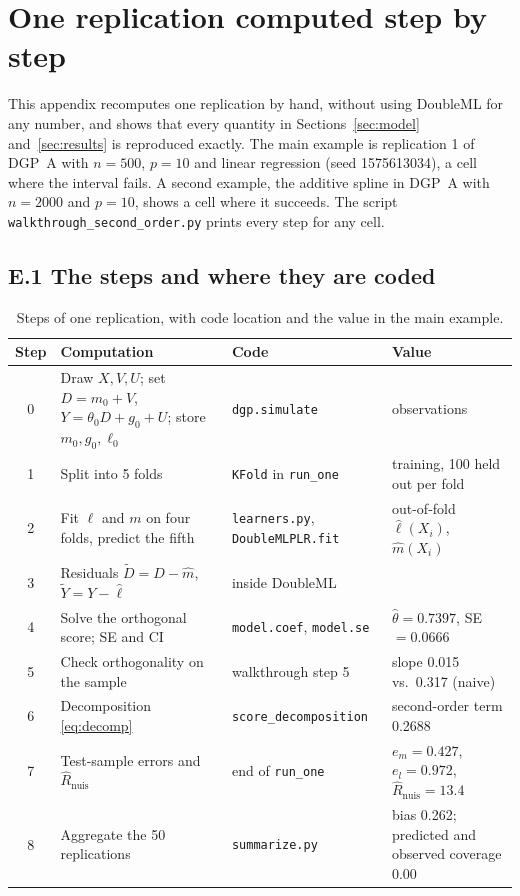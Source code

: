 \documentclass[11pt,a4paper]{article}
\newcommand{\Rnuis}{\hat R_{\mathrm{nuis}}}
\newcommand{\code}[1]{\texttt{#1}}
\begin{document}
\section{One replication computed step by step}\label{app:walk}

This appendix recomputes one replication by hand, without using DoubleML for any number, and shows that every quantity in Sections~\ref{sec:model} and~\ref{sec:results} is reproduced exactly. The main example is replication 1 of DGP~A with $n=500$, $p=10$ and linear regression (seed 1575613034), a cell where the interval fails. A second example, the additive spline in DGP~A with $n=2000$ and $p=10$, shows a cell where it succeeds. The script \code{walkthrough\_second\_order.py} prints every step for any cell.

\subsection*{E.1 The steps and where they are coded}

\begin{table}[H]
\centering\small
\caption{Steps of one replication, with code location and the value in the main example.}\label{tab:steps}
\begin{tabularx}{\textwidth}{c>{\raggedright\arraybackslash}X>{\raggedright\arraybackslash}p{3.6cm}>{\raggedright\arraybackslash}p{3.8cm}}
\toprule
Step & Computation & Code & Value\\
\midrule
0 & Draw $X,V,U$; set $D=m_0+V$, $Y=\theta_0D+g_0+U$; store $m_0,g_0,\ell_0$ & \code{dgp.simulate} & 500 observations\\
1 & Split into 5 folds & \code{KFold} in \code{run\_one} & 400 training, 100 held out per fold\\
2 & Fit $\ell$ and $m$ on four folds, predict the fifth & \code{learners.py}, \code{DoubleMLPLR.fit} & out-of-fold $\hat\ell(X_i)$, $\hat m(X_i)$\\
3 & Residuals $\tilde D=D-\hat m$, $\tilde Y=Y-\hat\ell$ & inside DoubleML & \\
4 & Solve the orthogonal score; SE and CI & \code{model.coef}, \code{model.se} & $\hat\theta=0.7397$, SE $=0.0666$\\
5 & Check orthogonality on the sample & walkthrough step 5 & slope 0.015 vs.\ 0.317 (naive)\\
6 & Decomposition \eqref{eq:decomp} & \code{score\_decomposition} & second-order term 0.2688\\
7 & Test-sample errors and $\Rnuis$ & end of \code{run\_one} & $e_m=0.427$, $e_l=0.972$, $\Rnuis=13.4$\\
8 & Aggregate the 50 replications & \code{summarize.py} & bias 0.262; predicted and observed coverage 0.00\\
\bottomrule
\end{tabularx}
\end{table}
\end{document}
